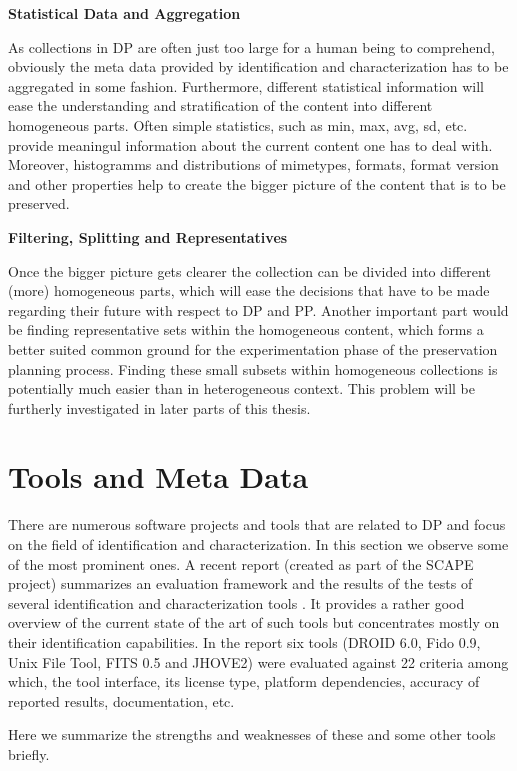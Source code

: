\textbf{Statistical Data and Aggregation}

As collections in DP are often just too large for a human being to comprehend, obviously the meta data provided by identification and characterization has to be aggregated in some fashion. Furthermore, different statistical information will ease the understanding and stratification of the content into different homogeneous parts. Often simple statistics, such as min, max, avg, sd, etc. provide meaningul information about the current content one has to deal with. Moreover, histogramms and distributions of mimetypes, formats, format version and other properties help to create the bigger picture of the content that is to be preserved. \newline

\textbf{Filtering, Splitting and Representatives}

Once the bigger picture gets clearer the collection can be divided into different (more) homogeneous parts, which will ease the decisions that have to be made regarding their future with respect to DP and PP.
Another important part would be finding representative sets within the homogeneous content, which forms a better suited common ground for the experimentation phase of the preservation planning process. Finding these small subsets within homogeneous collections is potentially much easier than in heterogeneous context. This problem will be furtherly investigated in later parts of this thesis.

\section{Tools and Meta Data}
There are numerous software projects and tools that are related to DP and focus on the field of identification and characterization. In this section we observe some of the most prominent ones. A recent report (created as part of the SCAPE project) summarizes an evaluation framework and the results of the tests of several identification and characterization tools \cite{Knijff:2011it}. It provides a rather good overview of the current state of the art of such tools but concentrates mostly on their identification capabilities. In the report six tools (DROID 6.0, Fido 0.9, Unix File Tool, FITS 0.5 and JHOVE2) were evaluated against 22 criteria among which, the tool interface, its license type, platform dependencies, accuracy of reported results, documentation, etc.

Here we summarize the strengths and weaknesses of these and some other tools briefly.

